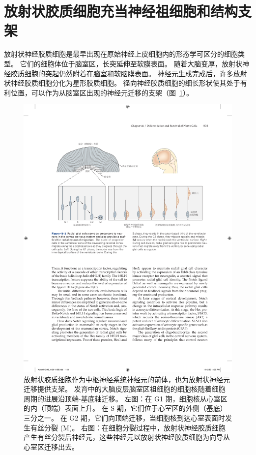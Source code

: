 \section{放射状胶质细胞充当神经祖细胞和结构支架}

放射状神经胶质细胞是最早出现在原始神经上皮细胞内的形态学可区分的细胞类型。
它们的细胞体位于脑室区，长突延伸至软膜表面。
随着大脑变厚，放射状神经胶质细胞的突起仍然附着在脑室和软脑膜表面。
神经元生成完成后，许多放射状神经胶质细胞分化为星形胶质细胞。
径向神经胶质细胞的细长形状使其处于有利位置，可以作为从脑室区出现的神经元迁移的支架（图~\ref{fig:46_2}）。


\begin{figure}[htbp]
	\centering
	\includegraphics[width=1.0\linewidth]{chap46/fig_46_2}
	\caption{放射状胶质细胞作为中枢神经系统神经元的前体，也为放射状神经元迁移提供支架。
		发育中的大脑皮层脑室区祖细胞的细胞核随着细胞周期的进展沿顶端-基底轴迁移。
		左图：在 G1 期，细胞核从心室区的内（顶端）表面上升。
		在 S 期，它们位于心室区的外侧（基底）三分之一。
		在 G2 期，它们向顶端迁移，当细胞核到达心室表面时发生有丝分裂 (M)。
		右图：在细胞分裂过程中，放射状神经胶质细胞产生有丝分裂后神经元，这些神经元以放射状神经胶质细胞为向导从心室区迁移出去。}
	\label{fig:46_2}
\end{figure}


